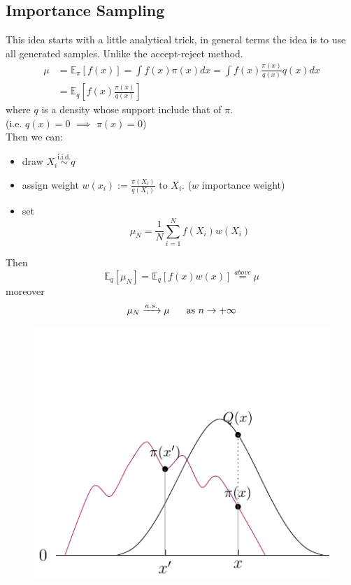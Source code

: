 \documentclass{article}
\begin{document}
\subsection{Importance Sampling}
This idea starts with a little analytical trick, in general terms the idea is to use all generated samples. Unlike the accept-reject method. \\
\begin{equation*}
\begin{split}
    \mu&= \mathbb{E}_{\pi}[f(x)] = \int f(x) \pi(x) dx = \int f(x) \frac{\pi(x)}{q(x)} q(x) dx \\
    &= \mathbb{E}_{q}\left[f(x)\frac{\pi(x)}{q(x)}\right]
\end{split}
\end{equation*}
where $q$ is a density whose support include that of $\pi$.\\ (i.e. $q(x)=0$ $\implies$ $\pi(x)=0$)\\
Then we can:
\begin{itemize}
    \item draw $X_i \stackrel{\text{i.i.d.}}{\sim} q$ 
    \item assign weight $w(x_i):= \frac{\pi(X_i)}{q(X_ i)}$ to $X_i$. ($w$ importance weight)
    \item  set 
    \begin{equation*}
        \mu_N= \frac{1}{N} \sum_{i=1}^N f(X_i)w(X_i)
    \end{equation*}
\end{itemize}
Then
\begin{equation*}
    \mathbb{E}_q[\mu_N]= \mathbb{E}_q [f(x)w(x)] \stackrel{above}{=} \mu 
\end{equation*}
moreover
\begin{equation*}
    \mu_N \xrightarrow{a.s.} \mu \hspace{0.5 cm} \text{ as } n \rightarrow + \infty
\end{equation*}
\begin{figure}[H]
    \centering
    \includegraphics{standalones/pdfs/impsamp}
    \label{impsamp}
\end{figure}
\end{document}
